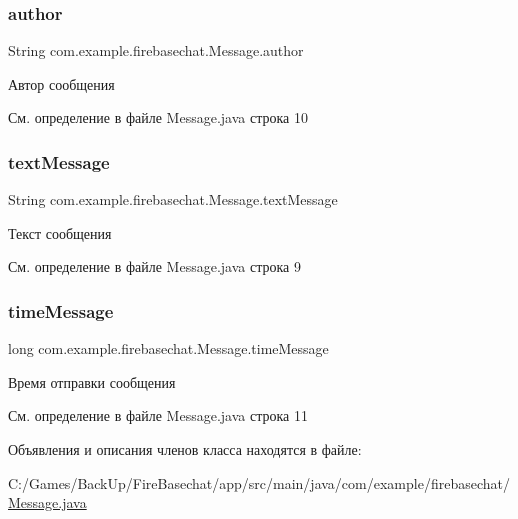 \subsubsection{\texorpdfstring{author}{author}}
{\footnotesize\ttfamily String com.\+example.\+firebasechat.\+Message.\+author}



Автор сообщения 



См. определение в файле Message.\+java строка 10

\mbox{\label{classcom_1_1example_1_1firebasechat_1_1_message_acb2c8f619df31749afdc79e92b1481e8}} 
\subsubsection{\texorpdfstring{text\+Message}{textMessage}}
{\footnotesize\ttfamily String com.\+example.\+firebasechat.\+Message.\+text\+Message}



Текст сообщения 



См. определение в файле Message.\+java строка 9

\mbox{\label{classcom_1_1example_1_1firebasechat_1_1_message_a09635d0a02cd29c65625d1d1c2a616a3}} 
\subsubsection{\texorpdfstring{time\+Message}{timeMessage}}
{\footnotesize\ttfamily long com.\+example.\+firebasechat.\+Message.\+time\+Message}



Время отправки сообщения 



См. определение в файле Message.\+java строка 11



Объявления и описания членов класса находятся в файле\+:\begin{DoxyCompactItemize}
\item 
C\+:/\+Games/\+Back\+Up/\+Fire\+Basechat/app/src/main/java/com/example/firebasechat/\mbox{\hyperlink{_message_8java}{Message.\+java}}\end{DoxyCompactItemize}
